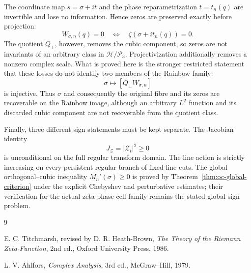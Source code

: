 \documentclass[11pt]{amsart}
\numberwithin{equation}{section}
\newcommand{\Zcal}{\mathcal Z}
\begin{document}
The coordinate map $s=\sigma+it$ and the phase reparametrization
$t=t_n(q)$ are invertible and lose no information.  Hence zeros are
preserved exactly before projection:
\[
W_{\sigma,n}(q)=0
\quad\Longleftrightarrow\quad
\zeta(\sigma+i t_n(q))=0.
\]
The quotient $Q_\perp$, however, removes the cubic component, so zeros
are not invariants of an arbitrary class in $\mathcal H/\mathcal P_3$.
Projectivization additionally removes a nonzero complex scale.  What is
proved here is the stronger restricted statement that these losses do
not identify two members of the Rainbow family:
\[
\sigma\longmapsto[Q_\perp W_{\sigma,n}]
\]
is injective.  Thus $\sigma$ and consequently the original fibre and
its zeros are recoverable on the Rainbow image, although an arbitrary
$L^2$ function and its discarded cubic component are not recoverable
from the quotient class.

Finally, three different sign statements must be kept separate.  The
Jacobian identity
\[
J_{\Zcal}=|\Zcal_t|^2\ge0
\]
is unconditional on the full regular transform domain.  The line action
is strictly increasing on every persistent regular branch of fixed-line
cuts.  The global orthogonal--cubic inequality $M_n'(\sigma)\ge0$ is
proved by Theorem~\ref{thm:oc-global-criterion} under the explicit
Chebyshev and perturbative estimates; their verification for the actual
zeta phase-cell family remains the stated global sign problem.

\begin{thebibliography}{9}

E. C. Titchmarsh, revised by D. R. Heath-Brown,
\emph{The Theory of the Riemann Zeta-Function}, 2nd ed.,
Oxford University Press, 1986.

L. V. Ahlfors,
\emph{Complex Analysis}, 3rd ed.,
McGraw--Hill, 1979.

\end{thebibliography}
\end{document}
